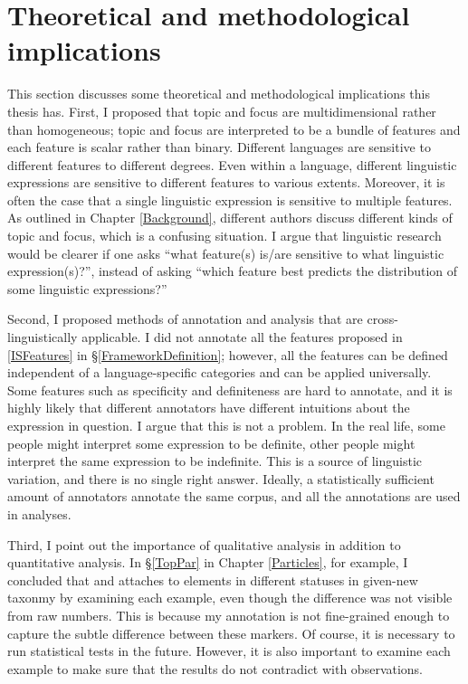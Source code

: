 \section{Theoretical and methodological implications}

This section discusses some theoretical and methodological implications
this thesis has.
First, I proposed that topic and focus are multidimensional
rather than homogeneous;
topic and focus are interpreted to be a bundle of features and
each feature is scalar rather than binary.
Different languages are sensitive to different features to different degrees.
Even within a language,
different linguistic expressions are sensitive to different features to various extents.
Moreover, it is often the case that
a single linguistic expression is sensitive to multiple features.
As outlined in Chapter \ref{Background},
different authors discuss different kinds of topic and focus,
which is a confusing situation.
I argue that linguistic research would be clearer if one asks
``what feature(s) is/are sensitive to what linguistic expression(s)?'',
instead of asking
``which feature best predicts the distribution of some linguistic expressions?''

Second,
I proposed methods of annotation and analysis
that are cross-linguistically applicable.
I did not annotate all the features proposed in \ref{ISFeatures} in \S \ref{FrameworkDefinition};
however, all the features can be defined independent of a language-specific categories and can be applied universally.
Some features such as specificity and definiteness are hard to annotate, and it is highly likely that different annotators have different intuitions about the expression in question.
I argue that this is not a problem.
In the real life,
some people might interpret some expression to be definite,
other people might interpret the same expression to be indefinite.
This is a source of linguistic variation, and there is no single right answer.
Ideally, a statistically sufficient amount of annotators annotate the same corpus, and all the annotations are used in analyses.

Third,
I point out the importance of qualitative analysis in addition to quantitative analysis.
In \S \ref{TopPar} in Chapter \ref{Particles}, for example,
I concluded that  and  attaches to elements in different statuses in given-new taxonmy by examining each example,
even though the difference was not visible from raw numbers.
This is because my annotation is not fine-grained enough to capture the subtle difference between these markers.
Of course, it is necessary to run statistical tests in the future.
However, it is also important to examine each example to make sure that
the results do not contradict with observations.



